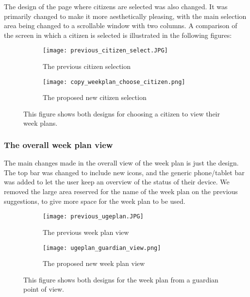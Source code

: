 \noindent
The design of the page where citizens are selected was also changed.
It was  primarily changed to make it more aesthetically pleasing, with the main selection area being changed to a scrollable window with two columns. 
A comparison of the screen in which a citizen is selected is illustrated in the following figures:
\begin{figure}[H]
    \begin{subfigure}{0.5\textwidth}
    \texttt{[image: previous\_citizen\_select.JPG]} 
    \caption{The previous citizen selection}
    \label{fig:previous_citizen_select}
    \end{subfigure}
    \begin{subfigure}{0.5\textwidth}
        \texttt{[image: copy\_weekplan\_choose\_citizen.png]}
    \caption{The proposed new citizen selection}
    \label{fig:new_citizen_select}
    \end{subfigure} 
    \caption{This figure shows both designs for choosing a citizen to view their week plans.}
    \label{fig:citizen_select}
\end{figure}
\noindent

\subsubsection{The overall week plan view}
The main changes made in the overall view of the week plan is just the design. 
The top bar was changed to include new icons, and the generic phone/tablet bar was added to let the user keep an overview of the status of their device.
We removed the large area reserved for the name of the week plan on the previous suggestions, to give more space for the week plan to be used. 
\begin{figure}[H]
    \begin{subfigure}{0.5\textwidth}
    \texttt{[image: previous\_ugeplan.JPG]} 
    \caption{The previous week plan view}
    \label{fig:previous_weekplan_view}
    \end{subfigure}
    \begin{subfigure}{0.5\textwidth}
        \texttt{[image: ugeplan\_guardian\_view.png]}
    \caption{The proposed new week plan view}
    \label{fig:new_weekplan_view}
    \end{subfigure} 
    \caption{This figure shows both designs for the week plan from a guardian point of view.}
    \label{fig:weekplan_view}
\end{figure}

